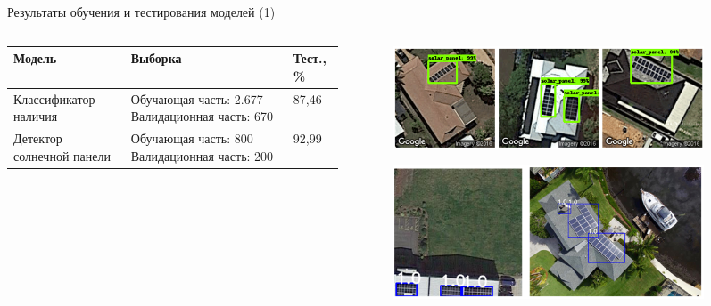 \documentclass[10pt]{beamer}
\begin{document}
        \begin{frame}{Результаты обучения и тестирования моделей (1)}
            \begin{columns}
                \begin{column}{0.55\textwidth}
                \begin{table}
                    \centering
                    \begin{tabular}{| p{2.3cm} | p{2.3cm} | p{1cm} | }
                        \hline
                        \textbf{Модель} & 
                        \textbf{Выборка} & \textbf{Тест., \%}\\
                        \hline
                        Классификатор наличия & Обучающая часть: 2.677\newline
                        Валидационная часть: 
                        670 & 87,46\\
                        \hline
                        Детектор солнечной панели & Обучающая часть:
                        800\newline
                        Валидационная часть:
                        200 & 92,99\\
                        \hline
                    \end{tabular}
                \end{table} 
                \end{column}
                \begin{column}{0.45\textwidth}
                    \begin{figure}
                        \centering
                        \includegraphics[width=0.9\textwidth]{pic4-22.png}
                    \end{figure}
                    \begin{figure}
                        \centering
                        \includegraphics[width=0.9\textwidth]{pic4-23.png}
                    \end{figure}
                \end{column}
            \end{columns}
        \end{frame}
\end{document}
